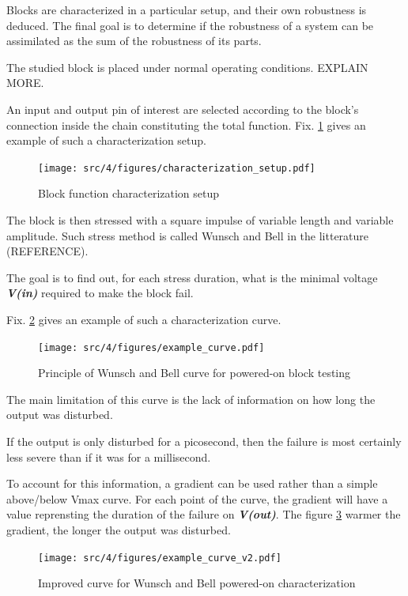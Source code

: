 Blocks are characterized in a particular setup, and their own robustness is deduced. The final goal is to determine if the robustness of
a system can be assimilated as the sum of the robustness of its parts.

The studied block is placed under normal operating conditions. EXPLAIN MORE.

An input and output pin of interest are selected according to the block's connection inside the chain constituting the total function.
Fix. \ref{block_function_cz} gives an example of such a characterization setup.

\begin{figure}[!htbp]
  \centering
  \texttt{[image: src/4/figures/characterization\_setup.pdf]}
  \caption{Block function characterization setup}
  \label{block_function_cz}
\end{figure}

The block is then stressed with a square impulse of variable length and variable amplitude.
Such stress method is called Wunsch and Bell in the litterature (REFERENCE).

The goal is to find out, for each stress duration, what is the minimal voltage \textbf{\textit{V(in)}} required to make the block fail.

Fix. \ref{wb_cz_curve_example} gives an example of such a characterization curve.

\begin{figure}[!htbp]
  \centering
  \texttt{[image: src/4/figures/example\_curve.pdf]}
  \caption{Principle of Wunsch and Bell curve for powered-on block testing}
  \label{wb_cz_curve_example}
\end{figure}

The main limitation of this curve is the lack of information on how long the output was disturbed.

If the output is only disturbed for a picosecond, then the failure is most certainly less severe than if it was for a millisecond.

To account for this information, a gradient can be used rather than a simple above/below Vmax curve.
For each point of the curve, the gradient will have a value reprensting the duration of the failure on \textbf{\textit{V(out)}}.
The figure \ref{wb_cz_curve_example_v2} warmer the gradient, the longer the output was disturbed.

\begin{figure}[!htbp]
  \centering
  \texttt{[image: src/4/figures/example\_curve\_v2.pdf]}
  \caption{Improved curve for Wunsch and Bell powered-on characterization}
  \label{wb_cz_curve_example_v2}
\end{figure}

